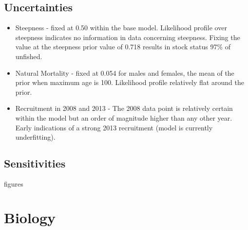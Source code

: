 \documentclass[pdf]{beamer}\usepackage[]{graphicx}\usepackage[]{color}
\begin{document}
\subsection{Uncertainties}
\begin{frame}
  \begin{itemize}
    \item Steepness - fixed at 0.50 within the base model.  Likelihood profile over steepness indicates no information in data concerning steepness.  Fixing the value at the steepness prior value of 0.718 results in stock status 97\% of unfished.
    \item Natural Mortality - fixed at 0.054 for males and females, the mean of the prior when maximum age is 100.  Likelihood profile relatively flat around the prior.
    \item Recruitment in 2008 and 2013 - The 2008 data point is relatively certain within the model but an order of magnitude higher than any other year.  Early indications of a strong 2013 recruitment (model is currently underfitting).
  \end{itemize}
\end{frame}

\subsection{Sensitivities}
\begin{frame}
  figures
\end{frame}



\section{Biology}

\end{document}
